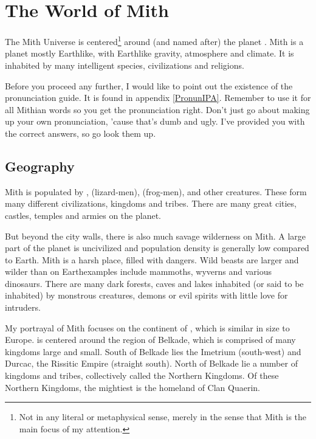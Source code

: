 \chapter{The World of Mith}

The Mith Universe is centered\footnote{Not  in any literal or metaphysical sense, merely in the sense that Mith is the main focus of my attention.} around (and named after) the planet %
. Mith is a planet mostly Earthlike, with Earthlike gravity, atmosphere and climate. It is inhabited by many intelligent species, civilizations and religions. 

Before you proceed any further, I would like to point out the existence of the pronunciation guide. It is found in appendix \ref{PronunIPA}. Remember to use it for all Mithian words so you get the pronunciation right. Don't just go about making up your own pronunciation, 'cause that's dumb and ugly. I've provided you with the correct answers, so go look them up. 



\section{Geography}
Mith is populated by \humans{}, \scathae{} (lizard-men), \meccara{} (frog-men), \dragons{} and other creatures. These form many different civilizations, kingdoms and tribes. There are many great cities, castles, temples and armies on the planet. 

But beyond the city walls, there is also much savage wilderness on Mith. A large part of the planet is uncivilized and population density is generally low compared to Earth. Mith is a harsh place, filled with dangers. Wild beasts are larger and wilder than on Earth\dash{}examples include mammoths, wyverns and various dinosaurs. There are many dark forests, caves and lakes inhabited (or said to be inhabited) by monstrous creatures, demons or evil spirits with little love for intruders. 

My portrayal of Mith focuses on the continent of \intro{\KnownWorld{}}, which is similar in size to Europe. \KnownWorld{} is centered around the region of Belkade, which is comprised of many kingdoms large and small. South of Belkade lies the Imetrium (south-west) and Durcac, the Rissitic Empire (straight south). North of Belkade lie a number of kingdoms and tribes, collectively called the Northern Kingdoms. Of these Northern Kingdoms, the mightiest is the homeland of Clan Quaerin. 


